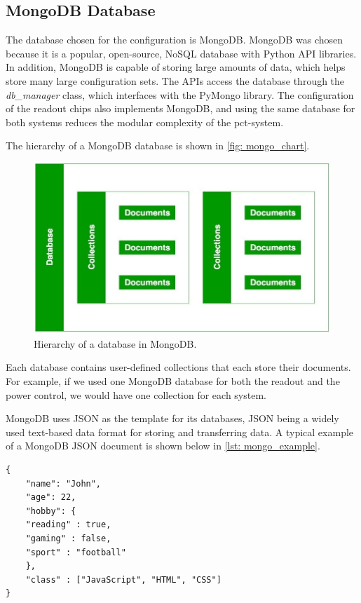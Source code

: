 \documentclass[main.tex]{subfiles}
\begin{document}
\subsection{MongoDB Database}
\label{ssec: mongo}
The database chosen for the configuration is MongoDB. MongoDB was chosen because it is a popular, open-source, NoSQL database with Python API libraries. In addition, MongoDB is capable of storing large amounts of data, which helps store many large configuration sets. The APIs access the database through the \textit{db\_manager} class, which interfaces with the PyMongo library. The configuration of the readout chips also implements MongoDB, and using the same database for both systems reduces the modular complexity of the \gls{pct}-system.

The hierarchy of a MongoDB database is shown in \autoref{fig: mongo_chart}.

\begin{figure}[!ht]
    \centering
    \includegraphics[width=12cm, scale=1.5]{images/mongodb-nosql-working.jpg}
    \caption{Hierarchy of a database in MongoDB.}
    \label{fig: mongo_chart}
\end{figure}
\FloatBarrier

Each database contains user-defined collections that each store their documents. For example, if we used one MongoDB database for both the readout and the power control, we would have one collection for each system.

MongoDB uses JSON as the template for its databases, JSON being a widely used text-based data format for storing and transferring data. A typical example of a MongoDB JSON document is shown below in \autoref{lst: mongo_example}.


\begin{lstlisting}[caption={Example document using JSON to store information.},captionpos=b, label=lst: mongo_example]
{
    "name": "John",
    "age": 22,
    "hobby": {
	"reading" : true,
	"gaming" : false,
	"sport" : "football"
    },
    "class" : ["JavaScript", "HTML", "CSS"]
}
    \end{lstlisting}
\end{document}
